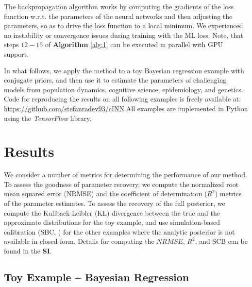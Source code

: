 \documentclass[9pt,twoside,lineno]{pnas-new}
\begin{document}
The backpropagation algorithm works by computing the gradients of the loss function w.r.t. the parameters of the neural networks and then adjusting the parameters, so as to drive the loss function to a local minimum. We experienced no instability or convergence issues during training with the ML loss. Note, that steps $12-15$ of \textbf{Algorithm} \ref{alg:1} can be executed in parallel with GPU support. 

In what follows, we apply the method to a toy Bayesian regression example with conjugate priors, and then use it to estimate the parameters of challenging models from population dynamics, cognitive science, epidemiology, and genetics. Code for reproducing the results on all following examples is freely available at: \href{https://github.com/stefanradev93/cINN}{https://github.com/stefanradev93/cINN}.All examples are implemented in Python using the \textit{TensorFlow} library.

\section*{Results}

We consider a number of metrics for determining the performance of our method. To assess the goodness of parameter recovery, we compute the normalized root mean squared error (NRMSE) and the coefficient of determination ($R^{2}$) metrics of the parameter estimates. To assess the recovery of the full posterior, we compute the Kullback-Leibler (KL) divergence \cite{hershey2007approximating} between the true and the approximate distributions for the toy example, and use simulation-based calibration (SBC, \cite{talts2018validating}) for the other examples where the analytic posterior is not available in closed-form. Details for computing the $NRMSE$, $R^2$, and SCB can be found in the \textbf{SI}.

\subsection*{Toy Example – Bayesian Regression}
\end{document}
